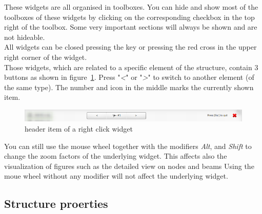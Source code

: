 \documentclass[a4paper,11pt]{report}
\begin{document}
These widgets are all organised in toolboxes. You can hide and show most of the toolboxes of these widgets by clicking on the corresponding checkbox in the top right of the toolbox. Some very important sections will always be shown and are not hideable.\\
All widgets can be closed pressing the  key or pressing the red cross in the upper right corner of the widget. \\
Those widgets, which are related to a specific element of the structure, contain 3 buttons as shown in figure~\ref{pic:overlayheader}. Press "\textit{<}" or "\textit{>}" to switch to another element (of the same type). The number and icon in the middle marks the currently shown item.

\begin{figure}[H]
\begin{center}
\includegraphics[width=\textwidth]{../pictures/overlayheader.png}
\caption{header item of a right click widget}
\label{pic:overlayheader}
\end{center}
\end{figure}

You can still use the mouse wheel together with the modifiers \textit{Alt},  and \textit{Shift} to change the zoom factors of the underlying widget. This affects also the visualization of figures such as the detailed view on nodes and beams Using the moue wheel without any modifier will not affect the underlying widget.


\subsection{Structure proerties}
\label{sec:structdetail}


\begin{figure}[H]
\label{pic:generaloverlay}
\end{figure}
\end{document}
